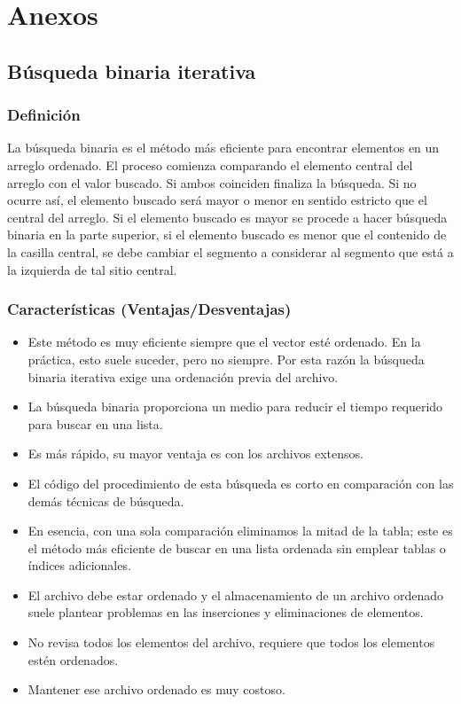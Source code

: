 
\section{Anexos}

\subsection{Búsqueda binaria iterativa}

\subsubsection{Definición}

La búsqueda binaria es el método más eficiente para encontrar elementos en un arreglo ordenado. El proceso comienza comparando el elemento central del arreglo con el valor buscado. Si ambos coinciden finaliza la búsqueda. Si no ocurre así, el elemento buscado será mayor o menor en sentido estricto que el central del arreglo. Si el elemento buscado es mayor se procede a hacer búsqueda binaria en la parte superior, si el elemento buscado es menor que el contenido de la casilla central, se debe cambiar el segmento a considerar al segmento que está a la izquierda de tal sitio central.

\subsubsection{Características (Ventajas/Desventajas)}

\begin{itemize}
\item Este método es muy eficiente siempre que el vector esté ordenado. En la práctica, esto suele suceder, pero no siempre. Por esta razón la búsqueda binaria iterativa exige una ordenación previa del archivo. 
\item La búsqueda binaria proporciona un medio para reducir el tiempo requerido para buscar en una lista. 
\item Es más rápido, su mayor ventaja es con los archivos extensos. 
\item El código del procedimiento de esta búsqueda es corto en comparación con las demás técnicas de búsqueda. 
\item En esencia, con una sola comparación eliminamos la mitad de la tabla; este es el método más eficiente de buscar en una lista ordenada sin emplear tablas o índices adicionales.
\item El archivo debe estar ordenado y el almacenamiento de un archivo ordenado suele plantear problemas en las inserciones y eliminaciones de elementos.
\item No revisa todos los elementos del archivo, requiere que todos los elementos estén ordenados. 
\item Mantener ese archivo ordenado es muy costoso.
\end{itemize}

